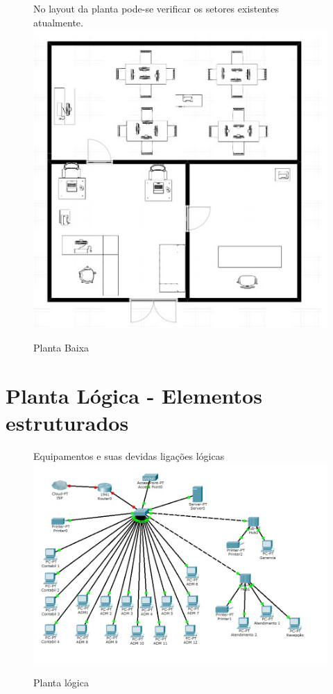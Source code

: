\documentclass[	DIV=calc,%
							paper=a4,%
							fontsize=12pt,%
							onecolumn]{scrartcl}	 					%
\begin{document}
\begin{figure}[H]
	No layout da planta pode-se verificar os setores existentes atualmente.
	\centering
	\includegraphics[scale=1]{fig1}
	\caption{Planta Baixa}
	\label{fig1}
	\end{figure}

\section{Planta Lógica - Elementos estruturados}


\begin{figure}[H]
	Equipamentos e suas devidas ligações lógicas
	\centering
	\includegraphics[scale=0.5]{fig2}
	\caption{Planta lógica}
	\label{fig2}
	\end{figure}
	
\end{document}
